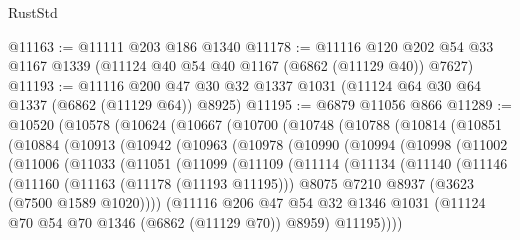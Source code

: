 \begin{lexlean}{RustStd}
\begin{coremodule}
@11163 := @11111 @203 @186 @1340
@11178 := @11116 @120 @202 @54 @33 @1167 @1339 (@11124 @40 @54 @40 @1167 (@6862 (@11129 @40)) @7627)
@11193 := @11116 @200 @47 @30 @32 @1337 @1031 (@11124 @64 @30 @64 @1337 (@6862 (@11129 @64)) @8925)
@11195 := @6879 @11056 @866
@11289 := @10520
    (@10578
      (@10624
        (@10667
          (@10700
            (@10748
              (@10788
                (@10814
                  (@10851
                    (@10884
                      (@10913
                        (@10942
                          (@10963
                            (@10978
                              (@10990
                                (@10994
                                  (@10998
                                    (@11002
                                      (@11006
                                        (@11033
                                          (@11051
                                            (@11099
                                              (@11109
                                                (@11114
                                                  (@11134
                                                    (@11140
                                                      (@11146
                                                        (@11160
                                                          (@11163 (@11178 (@11193 @11195)))
                                                          @8075
                                                          @7210
                                                          @8937
                                                          (@3623 (@7500 @1589 @1020))))
                                                      (@11116
                                                        @206
                                                        @47
                                                        @54
                                                        @32
                                                        @1346
                                                        @1031
                                                        (@11124
                                                          @70
                                                          @54
                                                          @70
                                                          @1346
                                                          (@6862 (@11129 @70))
                                                          @8959)
                                                        @11195))))

\end{coremodule}
\end{lexlean}
